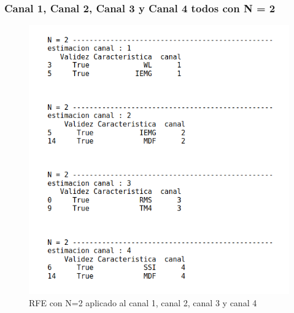         \subsubsection{Canal 1, Canal 2, Canal 3 y Canal 4 todos con N = 2} 
        \begin{figure}[ht]
            \centering
            \includegraphics[scale=0.3]{imagenes/N2 canales 1234.png}
            \caption{RFE con N=2 aplicado al canal 1, canal 2, canal 3 y canal 4}
            \label{fig:N2 canal 1234}
        \end{figure}
        
